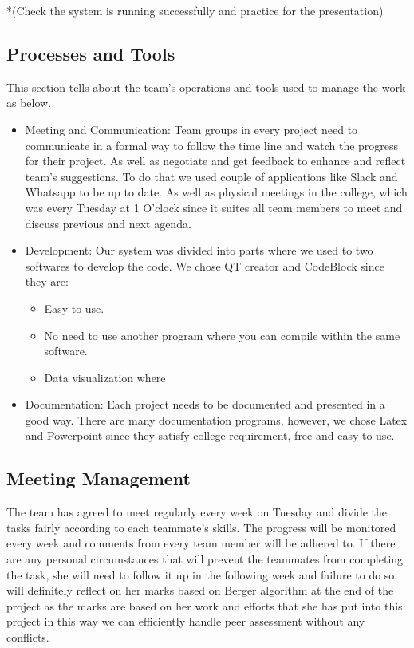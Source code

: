 \documentclass{article}
\begin{document}
*(Check the system is running successfully and practice for the presentation) 
 


\subsection{Processes and Tools}

This section tells about the team's operations and tools used to manage the work as below.   
\begin{itemize}


\item Meeting and Communication: Team groups in every project need to communicate in a formal way to follow the time line and watch the progress for their project. As well as negotiate and get feedback to enhance and reflect team’s suggestions. To do that we used couple of applications like Slack and Whatsapp to be up to date. As well as physical meetings in the college, which was every Tuesday at 1 O’clock since it suites all team members to meet and discuss previous and next agenda. 
\item Development: Our system was divided into parts where we used to two softwares to develop the code. We chose QT creator and CodeBlock since they are:
\begin{itemize}
\item 	Easy to use.
\item	No need to use another program where you can compile within the same software.
\item Data visualization where 

\end{itemize}
\item Documentation: Each project needs to be documented and presented in a good way. There are many documentation programs, however, we chose Latex and Powerpoint since they satisfy college requirement, free and easy to use. 



\end{itemize}



\subsection{Meeting Management} 
The team has agreed to meet regularly every week on Tuesday and divide the tasks fairly according to each teammate's skills. The progress will be monitored every week and comments from every team member will be adhered to. \newline If there are any personal circumstances that will prevent the teammates from completing the task, she will need to follow it up in the following week and failure to do so, will definitely reflect on her marks based on Berger algorithm at the end of the project as the marks are based on her work and efforts that she has put into this project in this way we can efficiently handle peer assessment without any conflicts. 
\end{document}
